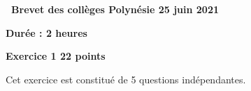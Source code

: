 \documentclass[11pt]{article}
\begin{document}
\label{Polynesie}

\pagestyle{fancy}
\thispagestyle{empty}
\begin{center}

{\Large \textbf{\decofourleft~Brevet des collèges Polynésie 25 juin 2021~\decofourright}}

\bigskip

\textbf{Durée : 2 heures} \end{center}

\bigskip

\textbf{Exercice 1 \hfill 22 points}

\medskip

Cet exercice est constitué de 5 questions indépendantes.

\medskip
\end{document}
